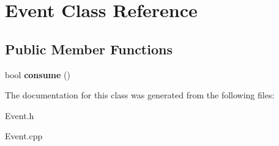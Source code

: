 \hypertarget{class_event}{}\section{Event Class Reference}
\label{class_event}
\subsection*{Public Member Functions}
\begin{DoxyCompactItemize}
\item 
\mbox{\label{class_event_a93521bedffd2a0b9c979e15241e060ba}} 
bool {\bfseries consume} ()
\end{DoxyCompactItemize}


The documentation for this class was generated from the following files\+:\begin{DoxyCompactItemize}
\item 
Event.\+h\item 
Event.\+cpp\end{DoxyCompactItemize}
